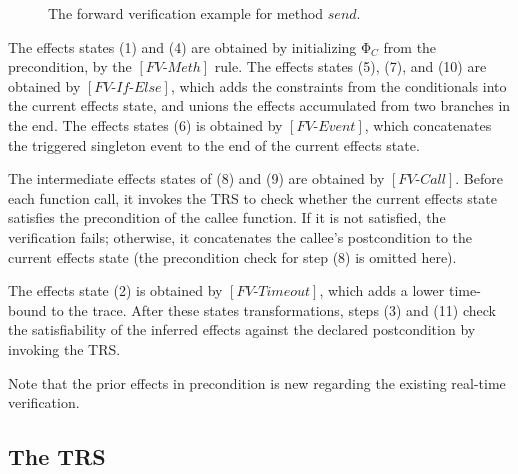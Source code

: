 \documentclass[acmsmall,10pt,review]{acmart}
\newcommand{\effect}{{\ensuremath{\mathrm{\Phi}}}}
\newcommand{\code}[1]{{\tt{\ensuremath{\m{#1}}}}}
\newcommand{\m}{\mathit}
\begin{document}
{\begin{figure}[!ht]
\begin{minipage}[c]{\columnwidth}
{\begin{enumerate}
     
\end{enumerate}}

     \end{minipage}

      \caption{The forward verification example for method \code{send}. }\label{fig:forward_example}
\end{figure}
}



The effects states (1) and (4) are obtained by initializing 
\code{\effect_C} from the precondition, by the \code{[FV\text{-}Meth]} rule. 
The effects states (5), (7), and (10) are obtained by  
\code{[FV\text{-}If\text{-}Else]}, which adds the constraints 
from the conditionals into the current effects state, 
and unions the effects accumulated from two branches in the end. 
The effects states (6) is obtained by \code{[FV\text{-}Event]}, 
which concatenates the triggered singleton event to the 
end of the current effects state. 

The intermediate effects states of (8) and (9) are obtained by \code{[FV\text{-}Call]}. 
Before each function call, it invokes the TRS to check whether the current effects state 
satisfies the precondition of the callee function. 
If it is not satisfied, the verification fails; otherwise, 
it concatenates the callee's postcondition to the current 
effects state (the precondition check for step (8) is omitted here).

The effects state (2) is obtained by \code{[FV\text{-}Timeout]}, 
which adds a lower time-bound to the trace. 
After these states transformations, steps (3) and (11) check the 
satisfiability of the inferred effects against the declared 
postcondition by invoking the TRS. 

Note that the prior effects in precondition is new regarding 
the existing real-time verification. 






\subsection{The TRS}
\end{document}
